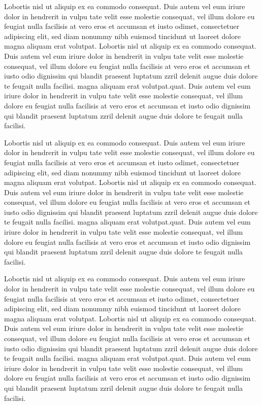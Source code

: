 \documentclass[a4paper, oneside, twocolumn, notitlepage, 10pt]{extarticle_ecoc}
\begin{document}
Lobortis nisl ut aliquip ex ea commodo consequat. Duis autem vel eum
iriure dolor in hendrerit in vulpu tate velit esse molestie
consequat, vel illum dolore eu feugiat nulla facilisis at vero eros
et accumsan et iusto odimet, consectetuer adipiscing elit, sed diam
nonummy nibh euismod tincidunt ut laoreet dolore magna aliquam erat
volutpat. Lobortis nisl ut aliquip ex ea commodo consequat. Duis
autem vel eum iriure dolor in hendrerit in vulpu tate velit esse
molestie consequat, vel illum dolore eu feugiat nulla facilisis at
vero eros et accumsan et iusto odio dignissim qui blandit praesent
luptatum zzril delenit augue duis dolore te feugait nulla facilisi.
magna aliquam erat volutpat.quat. Duis autem vel eum iriure dolor in
hendrerit in vulpu tate velit esse molestie consequat, vel illum
dolore eu feugiat nulla facilisis at vero eros et accumsan et iusto
odio dignissim qui blandit praesent luptatum zzril delenit augue
duis dolore te feugait nulla facilisi.

Lobortis nisl ut aliquip ex ea commodo consequat. Duis autem vel eum
iriure dolor in hendrerit in vulpu tate velit esse molestie
consequat, vel illum dolore eu feugiat nulla facilisis at vero eros
et accumsan et iusto odimet, consectetuer adipiscing elit, sed diam
nonummy nibh euismod tincidunt ut laoreet dolore magna aliquam erat
volutpat. Lobortis nisl ut aliquip ex ea commodo consequat. Duis
autem vel eum iriure dolor in hendrerit in vulpu tate velit esse
molestie consequat, vel illum dolore eu feugiat nulla facilisis at
vero eros et accumsan et iusto odio dignissim qui blandit praesent
luptatum zzril delenit augue duis dolore te feugait nulla facilisi.
magna aliquam erat volutpat.quat. Duis autem vel eum iriure dolor in
hendrerit in vulpu tate velit esse molestie consequat, vel illum
dolore eu feugiat nulla facilisis at vero eros et accumsan et iusto
odio dignissim qui blandit praesent luptatum zzril delenit augue
duis dolore te feugait nulla facilisi.

Lobortis nisl ut aliquip ex ea commodo consequat. Duis autem vel eum
iriure dolor in hendrerit in vulpu tate velit esse molestie
consequat, vel illum dolore eu feugiat nulla facilisis at vero eros
et accumsan et iusto odimet, consectetuer adipiscing elit, sed diam
nonummy nibh euismod tincidunt ut laoreet dolore magna aliquam erat
volutpat. Lobortis nisl ut aliquip ex ea commodo consequat. Duis
autem vel eum iriure dolor in hendrerit in vulpu tate velit esse
molestie consequat, vel illum dolore eu feugiat nulla facilisis at
vero eros et accumsan et iusto odio dignissim qui blandit praesent
luptatum zzril delenit augue duis dolore te feugait nulla facilisi.
magna aliquam erat volutpat.quat. Duis autem vel eum iriure dolor in
hendrerit in vulpu tate velit esse molestie consequat, vel illum
dolore eu feugiat nulla facilisis at vero eros et accumsan et iusto
odio dignissim qui blandit praesent luptatum zzril delenit augue
duis dolore te feugait nulla facilisi.
\end{document}
